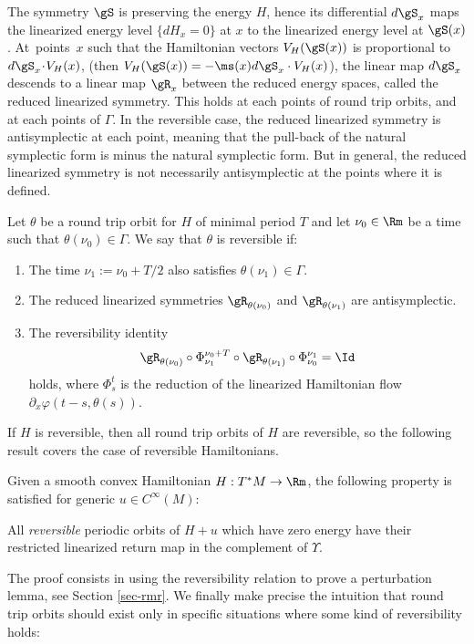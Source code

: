 The symmetry $\gS$ is preserving the energy $H$, hence its differential $d\gS_x$ maps the linearized energy level $\{dH_x=0\}$ at $x$ to the linearized energy level at $\gS(x)$.
At~points~$x$ such that the Hamiltonian vectors $V_H(\gS(x))$ is proportional to \hbox{$d\gS_x \!\cdot\! V_H(x)$},
(then $
V_H(\gS(x))=-\ms(x) d\gS_x\cdot V_H(x)$),
the linear map $d\gS_x$ descends to a linear map $\gR_x$ between the reduced energy spaces,
called the reduced linearized symmetry.
This holds at each points of round trip orbits, and at each points of $\Gamma$.
In the reversible case, the reduced linearized symmetry is antisymplectic at each point,
meaning that the pull-back of the natural symplectic form is minus the natural symplectic form.
But in general, the reduced linearized symmetry is not necessarily antisymplectic at the points where it is defined.

\begin{defn}
Let $\theta$ be a round trip orbit for $H$ of minimal period $T$ and let $\nu_0\in \Rm$ be a time such that $\theta(\nu_0) \in \Gamma$. We say that $\theta$ is reversible if:
\begin{enumerate}
\item
The time $\nu_1:=\nu_0+T/2$ also satisfies $\theta(\nu_1)\in \Gamma$.
\item The reduced linearized symmetries $\gR_{\theta(\nu_0)}$ and $\gR_{\theta(\nu_1)}$ are antisymplectic.
\item The reversibility identity
\[
\gR_{\theta(\nu_0)}\circ \Phi^{\nu_0+T}_{\nu_1}\circ \gR_{\theta(\nu_1)}\circ\Phi_{\nu_0}^{\nu_1}=\Id
\]
holds, where $\Phi^t_s$ is the reduction of the linearized Hamiltonian flow
$\partial_x \varphi(t-s,\theta(s))$.
\end{enumerate}
\end{defn}

If $H$ is reversible, then all round trip orbits of $H$ are reversible, so the following result covers the case of reversible Hamiltonians.

\begin{thm}\label{thm-g4}
Given a smooth convex Hamiltonian $H: T^*M\rightarrow \Rm$,
the following property is satisfied for generic $u\in C^{\infty}(M)$:

All \emph{reversible} periodic
orbits of $H+u$ which have zero energy have their restricted linearized
return map in the complement of $\Upsilon$.
\end{thm}

The proof consists in using the reversibility relation to prove a perturbation lemma, see Section \ref{sec-rmr}.
We finally make precise the intuition that round trip orbits should exist only in specific situations where some kind of reversibility holds:

